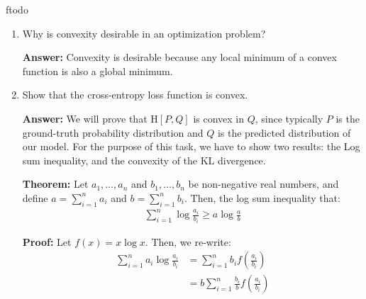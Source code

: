 ƒtodo\documentclass{article}
\newenvironment{QandA}{\begin{enumerate}[label=\arabic*.]}{\end{enumerate}}
\newenvironment{InnerQandA}{\begin{enumerate}[label=\roman*.]}{\end{enumerate}}
\newenvironment{answer}{\par\normalfont \textbf{Answer:}}{}
\newenvironment{theorem}{\par\normalfont \textbf{Theorem:}}{}
\newenvironment{proof}{\par\normalfont \textbf{Proof:}}{}
\newcommand{\CE}[2]{\text{H}\left[#1, #2 \right]}
\begin{document}
\begin{QandA}
\begin{InnerQandA}
        \item Why is convexity desirable in an optimization problem?
        \begin{answer}
            Convexity is desirable because any local minimum of a convex function is also a global minimum.
        \end{answer}

        \item Show that the cross-entropy loss function is convex.
        \begin{answer}
            We will prove that $\CE{P}{Q}$ is convex in $Q$, since typically $P$ is the ground-truth probability distribution and $Q$ is the predicted distribution of our model. For the purpose of this task, we have to show two results: the Log sum inequality, and the convexity of the KL divergence. 
            \begin{theorem}
                Let $a_1, \ldots, a_n$ and $b_1, \ldots, b_n$ be non-negative real numbers, and define $a = \sum_{i=1}^n a_i$ and $b = \sum_{i=1}^n b_i$. Then, the log sum inequality that:
                \begin{align*}
                    \sum_{i=1}^n \log \frac{a_i}{b_i} \ge a \log \frac{a}{b}
                \end{align*}
            \end{theorem}

            \begin{proof}
                Let $f(x) = x \log x$. Then, we re-write:
                \begin{align*}
                    \sum_{i=1}^n a_i \log \frac{a_i}{b_i} &= \sum_{i=1}^n b_i f \left(\frac{a_i}{b_i} \right) \\
                    &= b \sum_{i=1}^n \frac{b_i}{b} f \left( \frac{a_i}{b_i} \right)
                \end{align*}
            

\end{proof}
\end{answer}
\end{InnerQandA}
\end{QandA}
\end{document}
